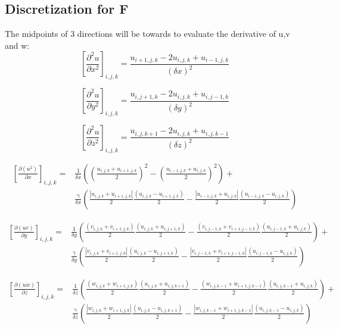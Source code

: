 \documentclass{article}%
\begin{document}
\subsection{Discretization for F}
The midpoints of 3 directions will be towards to evaluate the derivative of u,v and w:\\
\begin{equation}
\left[\frac{\partial^2 u}{\partial x^2}\right]_{i,j,k} =
\frac{u_{i+1,j,k} - 2u_{i,j,k} + u_{i-1,j,k}}{(\delta x)^2}
\end{equation}

\begin{equation}
\left[\frac{\partial^2 u}{\partial y^2}\right]_{i,j,k} =
\frac{u_{i,j+1,k} - 2u_{i,j,k} + u_{i,j-1,k}}{(\delta y)^2}
\end{equation}

\begin{equation}
\left[\frac{\partial^2 u}{\partial z^2}\right]_{i,j,k} =
\frac{u_{i,j,k+1} - 2u_{i,j,k} + u_{i,j,k-1}}{(\delta z)^2}
\end{equation}

\begin{equation}
\begin{split}
\left[\frac{\partial(u^2)}{\partial x}\right]_{i,j,k} = &
\frac{1}{\delta x}
\left(
	\left(\frac{u_{i,j,k}+u_{i+1,j,k}}{2}\right)^2 -
	\left(\frac{u_{i-1,j,k}+u_{i,j,k}}{2}\right)^2
\right) + \\
& \frac{\gamma}{\delta x}
\left(
	\frac{|u_{i,j,k}+u_{i+1,j,k}|}{2} \frac{(u_{i,j,k}-u_{i+1,j,k})}{2} -
	\frac{|u_{i-1,j,k}+u_{i,j,k}|}{2} \frac{(u_{i-1,j,k}-u_{i,j,k})}{2}
\right)
\end{split}
\end{equation}

\begin{equation}
\begin{split}
\left[\frac{\partial(uv)}{\partial y}\right]_{i,j,k} = &
\frac{1}{\delta y}
\left(
	\frac{(v_{i,j,k}+v_{i+1,j,k})}{2} \frac{(u_{i,j,k}+u_{i,j+1,k})}{2} -
	\frac{(v_{i,j-1,k}+v_{i+1,j-1,k})}{2} \frac{(u_{i,j-1,k}+u_{i,j,k})}{2}
\right) + \\
& \frac{\gamma}{\delta y}
\left(
	\frac{|v_{i,j,k}+v_{i+1,j,k}|}{2} \frac{(u_{i,j,k}-u_{i,j+1,k})}{2} -
	\frac{|v_{i,j-1,k}+v_{i+1,j-1,k}|}{2} \frac{(u_{i,j-1,k}-u_{i,j,k})}{2}
\right)
\end{split}
\end{equation}

\begin{equation}
\begin{split}
\left[\frac{\partial(uw)}{\partial z}\right]_{i,j,k} = &
\frac{1}{\delta z}
\left(
	\frac{(w_{i,j,k}+w_{i+1,j,k})}{2} \frac{(u_{i,j,k}+u_{i,j,k+1})}{2} -
	\frac{(w_{i,j,k-1}+w_{i+1,j,k-1})}{2} \frac{(u_{i,j,k-1}+u_{i,j,k})}{2}
\right) + \\
& \frac{\gamma}{\delta z}
\left(
	\frac{|w_{i,j,k}+w_{i+1,j,k}|}{2} \frac{(u_{i,j,k}-u_{i,j,k+1})}{2} -
	\frac{|w_{i,j,k-1}+w_{i+1,j,k-1}|}{2} \frac{(u_{i,j,k-1}-u_{i,j,k})}{2}
\right)
\end{split}
\end{equation}
\end{document}
